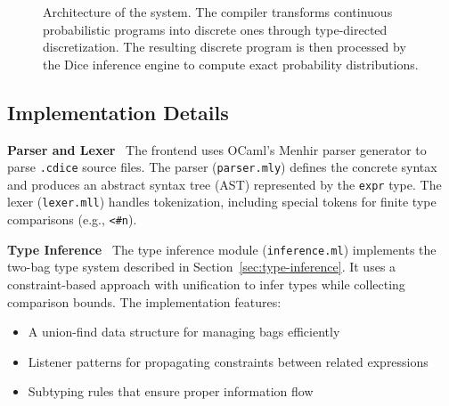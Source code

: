 \documentclass[acmsmall,screen,dvipsnames,x11names,nonacm,anonymous,review]{acmart}
\renewcommand{\paragraph}[1]{\vspace{1em}\noindent\textbf{#1}\ }
\begin{document}
\begin{figure}[h]
\caption{Architecture of the \Slice{} system. The \Slice{} compiler transforms continuous probabilistic programs into discrete ones through type-directed discretization. The resulting discrete program is then processed by the Dice inference engine to compute exact probability distributions.}
\label{fig:architecture}
\end{figure}

\subsection{Implementation Details}

\paragraph{Parser and Lexer} The frontend uses OCaml's Menhir parser generator to parse \texttt{.cdice} source files. The parser (\texttt{parser.mly}) defines the concrete syntax and produces an abstract syntax tree (AST) represented by the \texttt{expr} type. The lexer (\texttt{lexer.mll}) handles tokenization, including special tokens for finite type comparisons (e.g., \texttt{<\#n}).

\paragraph{Type Inference} The type inference module (\texttt{inference.ml}) implements the two-bag type system described in Section~\ref{sec:type-inference}. It uses a constraint-based approach with unification to infer types while collecting comparison bounds. The implementation features:
\begin{itemize}
    \item A union-find data structure for managing bags efficiently
    \item Listener patterns for propagating constraints between related expressions
    \item Subtyping rules that ensure proper information flow
\end{itemize}
\end{document}
